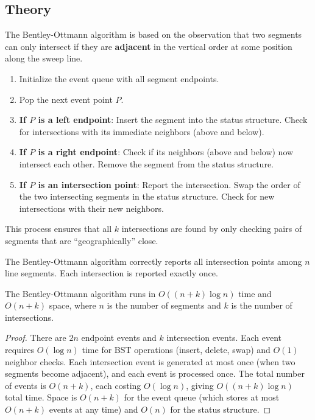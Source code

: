 \subsection{Theory}

The Bentley-Ottmann algorithm is based on the observation that two segments can only intersect if they are \textbf{adjacent} in the vertical order at some position along the sweep line.
\begin{enumerate}
\item Initialize the event queue with all segment endpoints.
\item Pop the next event point $P$.
\item \textbf{If $P$ is a left endpoint}: Insert the segment into the status structure. Check for intersections with its immediate neighbors (above and below).
\item \textbf{If $P$ is a right endpoint}: Check if its neighbors (above and below) now intersect each other. Remove the segment from the status structure.
\item \textbf{If $P$ is an intersection point}: Report the intersection. Swap the order of the two intersecting segments in the status structure. Check for new intersections with their new neighbors.
\end{enumerate}

This process ensures that all $k$ intersections are found by only checking pairs of segments that are ``geographically'' close.

\begin{theorem}\label{thm:bo_correctness}
The Bentley-Ottmann algorithm correctly reports all intersection points among $n$ line segments. Each intersection is reported exactly once.
\end{theorem}

\begin{theorem}\label{thm:bo_complexity}
The Bentley-Ottmann algorithm runs in $O((n + k) \log n)$ time and $O(n + k)$ space, where $n$ is the number of segments and $k$ is the number of intersections.
\end{theorem}
\begin{proof}
There are $2n$ endpoint events and $k$ intersection events. Each event requires $O(\log n)$ time for BST operations (insert, delete, swap) and $O(1)$ neighbor checks. Each intersection event is generated at most once (when two segments become adjacent), and each event is processed once. The total number of events is $O(n + k)$, each costing $O(\log n)$, giving $O((n + k) \log n)$ total time. Space is $O(n + k)$ for the event queue (which stores at most $O(n + k)$ events at any time) and $O(n)$ for the status structure.
\end{proof}

